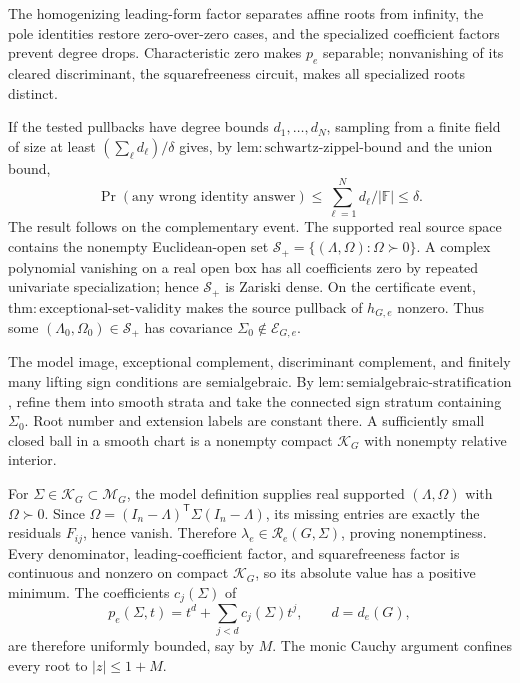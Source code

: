 The homogenizing leading-form factor separates affine roots from infinity, the pole identities restore zero-over-zero cases, and the specialized coefficient factors prevent degree drops. Characteristic zero makes \(p_e\) separable; nonvanishing of its cleared discriminant, the squarefreeness circuit, makes all specialized roots distinct.

If the tested pullbacks have degree bounds \(d_1,\ldots,d_N\), sampling from a finite field of size at least \((\sum_\ell d_\ell)/\delta\) gives, by \(\mathrm{lem:schwartz\mbox{-}zippel\mbox{-}bound}\) and the union bound,
\[
\Pr(\text{any wrong identity answer})\le\sum_{\ell=1}^N d_\ell/|\mathbb F|\le\delta.
\]
The result follows on the complementary event.
The supported real source space contains the nonempty Euclidean-open set \(\mathcal S_+=\{(\Lambda,\Omega):\Omega\succ0\}\). A complex polynomial vanishing on a real open box has all coefficients zero by repeated univariate specialization; hence \(\mathcal S_+\) is Zariski dense. On the certificate event, \(\mathrm{thm:exceptional\mbox{-}set\mbox{-}validity}\) makes the source pullback of \(h_{G,e}\) nonzero. Thus some \((\Lambda_0,\Omega_0)\in\mathcal S_+\) has covariance \(\Sigma_0\notin\mathcal E_{G,e}\).

The model image, exceptional complement, discriminant complement, and finitely many lifting sign conditions are semialgebraic. By \(\mathrm{lem:semialgebraic\mbox{-}stratification}\), refine them into smooth strata and take the connected sign stratum containing \(\Sigma_0\). Root number and extension labels are constant there. A sufficiently small closed ball in a smooth chart is a nonempty compact \(\mathcal K_G\) with nonempty relative interior.

For \(\Sigma\in\mathcal K_G\subset\mathcal M_G\), the model definition supplies real supported \((\Lambda,\Omega)\) with \(\Omega\succ0\). Since \(\Omega=(I_n-\Lambda)^{\mathsf T}\Sigma(I_n-\Lambda)\), its missing entries are exactly the residuals \(F_{ij}\), hence vanish. Therefore \(\lambda_e\in\mathcal R_e(G,\Sigma)\), proving nonemptiness.
Every denominator, leading-coefficient factor, and squarefreeness factor is continuous and nonzero on compact \(\mathcal K_G\), so its absolute value has a positive minimum. The coefficients \(c_j(\Sigma)\) of
\[
p_e(\Sigma,t)=t^d+\sum_{j<d}c_j(\Sigma)t^j,\qquad d=d_e(G),
\]
are therefore uniformly bounded, say by \(M\). The monic Cauchy argument confines every root to \(|z|\le1+M\).


